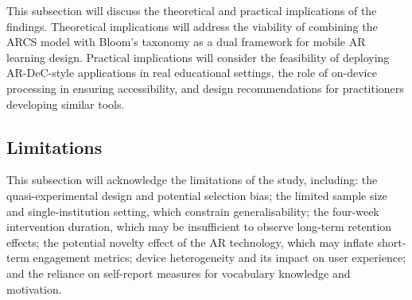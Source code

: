 This subsection will discuss the theoretical and practical implications of the findings. Theoretical implications will address the viability of combining the ARCS model with Bloom's taxonomy as a dual framework for mobile AR learning design. Practical implications will consider the feasibility of deploying AR-DeC-style applications in real educational settings, the role of on-device processing in ensuring accessibility, and design recommendations for practitioners developing similar tools.

\subsection{Limitations}
\label{subsec:limitations}

This subsection will acknowledge the limitations of the study, including: the quasi-experimental design and potential selection bias; the limited sample size and single-institution setting, which constrain generalisability; the four-week intervention duration, which may be insufficient to observe long-term retention effects; the potential novelty effect of the AR technology, which may inflate short-term engagement metrics; device heterogeneity and its impact on user experience; and the reliance on self-report measures for vocabulary knowledge and motivation.
